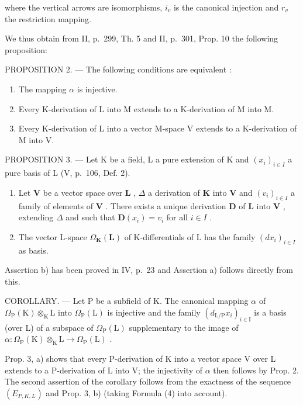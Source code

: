 where the vertical arrows are isomorphisms, \(i_{v}\) is the canonical injection and \(r_{v}\) the restriction mapping.

We thus obtain from II, p.~299, Th. 5 and II, p.~301, Prop. 10 the following proposition:

PROPOSITION 2. --- The following conditions are equivalent :

\begin{enumerate}
\def\labelenumi{\alph{enumi})}
\item
  The mapping \(\alpha\) is injective.
\item
  Every K-derivation of L into M extends to a K-derivation of M into M.
\item
  Every K-derivation of L into a vector M-space V extends to a K-derivation of M into V.
\end{enumerate}

PROPOSITION 3. --- Let K be a field, L a pure extension of K and \((x_{i})_{i\in I}\) a pure basis of L (V, p.~106, Def. 2).

\begin{enumerate}
\def\labelenumi{\alph{enumi})}
\item
  Let \(\mathbf{V}\) be a vector space over \(\mathbf{L}\) , \(\Delta\) a derivation of \(\mathbf{K}\) into \(\mathbf{V}\) and \((v_i)_{i\in I}\) a family of elements of \(\mathbf{V}\) . There exists a unique derivation \(\mathbf{D}\) of \(\mathbf{L}\) into \(\mathbf{V}\) , extending \(\Delta\) and such that \(\mathbf{D}(x_i) = v_i\) for all \(i\in I\) .
\item
  The vector L-space \(\Omega_{\mathbf{K}}(\mathbf{L})\) of K-differentials of L has the family \((dx_i)_{i\in I}\) as basis.
\end{enumerate}

Assertion b) has been proved in IV, p.~23 and Assertion a) follows directly from this.

COROLLARY. --- Let P be a subfield of K. The canonical mapping \(\alpha\) of \(\Omega_{\mathrm{P}}(\mathrm{K}) \otimes_{\mathrm{K}} \mathrm{L}\) into \(\Omega_{\mathrm{P}}(\mathrm{L})\) is injective and the family \((d_{\mathrm{L}/\mathrm{P}}x_{i})_{i \in \mathrm{I}}\) is a basis (over L) of a subspace of \(\Omega_{\mathrm{P}}(\mathrm{L})\) supplementary to the image of \(\alpha: \Omega_{\mathrm{P}}(\mathrm{K}) \otimes_{\mathrm{K}} \mathrm{L} \to \Omega_{\mathrm{P}}(\mathrm{L})\) .

Prop. 3, a) shows that every P-derivation of K into a vector space V over L extends to a P-derivation of L into V; the injectivity of \(\alpha\) then follows by Prop. 2. The second assertion of the corollary follows from the exactness of the sequence \((E_{P,K,L})\) and Prop. 3, b) (taking Formula (4) into account).

